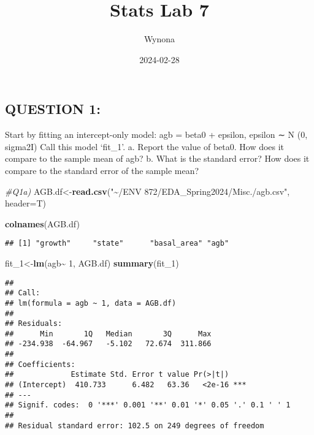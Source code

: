 \documentclass[
]{article}
\title{Stats Lab 7}
\author{Wynona}
\date{2024-02-28}
\newenvironment{Shaded}{\begin{snugshade}}{\end{snugshade}}
\newcommand{\AttributeTok}[1]{\textcolor[rgb]{0.13,0.29,0.53}{#1}}
\newcommand{\CommentTok}[1]{\textcolor[rgb]{0.56,0.35,0.01}{\textit{#1}}}
\newcommand{\DecValTok}[1]{\textcolor[rgb]{0.00,0.00,0.81}{#1}}
\newcommand{\FunctionTok}[1]{\textcolor[rgb]{0.13,0.29,0.53}{\textbf{#1}}}
\newcommand{\NormalTok}[1]{#1}
\newcommand{\OtherTok}[1]{\textcolor[rgb]{0.56,0.35,0.01}{#1}}
\newcommand{\SpecialCharTok}[1]{\textcolor[rgb]{0.81,0.36,0.00}{\textbf{#1}}}
\newcommand{\StringTok}[1]{\textcolor[rgb]{0.31,0.60,0.02}{#1}}
\begin{document}
\maketitle

\hypertarget{question-1}{%
\subsection{QUESTION 1:}\label{question-1}}

Start by fitting an intercept-only model: agb = beta0 + epsilon, epsilon
∼ N (0, sigma2I) Call this model `fit\_1'. a. Report the value of beta0.
How does it compare to the sample mean of agb? b. What is the standard
error? How does it compare to the standard error of the sample mean?

\begin{Shaded}
\begin{Highlighting}[]
\CommentTok{\#Q1a)}
\NormalTok{AGB.df}\OtherTok{\textless{}{-}}\FunctionTok{read.csv}\NormalTok{(}\StringTok{"\textasciitilde{}/ENV 872/EDA\_Spring2024/Misc./agb.csv"}\NormalTok{, }\AttributeTok{header=}\NormalTok{T)}

\FunctionTok{colnames}\NormalTok{(AGB.df)}
\end{Highlighting}
\end{Shaded}

\begin{verbatim}
## [1] "growth"     "state"      "basal_area" "agb"
\end{verbatim}

\begin{Shaded}
\begin{Highlighting}[]
\NormalTok{fit\_1}\OtherTok{\textless{}{-}}\FunctionTok{lm}\NormalTok{(agb}\SpecialCharTok{\textasciitilde{}} \DecValTok{1}\NormalTok{, AGB.df)}
\FunctionTok{summary}\NormalTok{(fit\_1)}
\end{Highlighting}
\end{Shaded}

\begin{verbatim}
## 
## Call:
## lm(formula = agb ~ 1, data = AGB.df)
## 
## Residuals:
##      Min       1Q   Median       3Q      Max 
## -234.938  -64.967   -5.102   72.674  311.866 
## 
## Coefficients:
##             Estimate Std. Error t value Pr(>|t|)    
## (Intercept)  410.733      6.482   63.36   <2e-16 ***
## ---
## Signif. codes:  0 '***' 0.001 '**' 0.01 '*' 0.05 '.' 0.1 ' ' 1
## 
## Residual standard error: 102.5 on 249 degrees of freedom
\end{verbatim}
\end{document}
